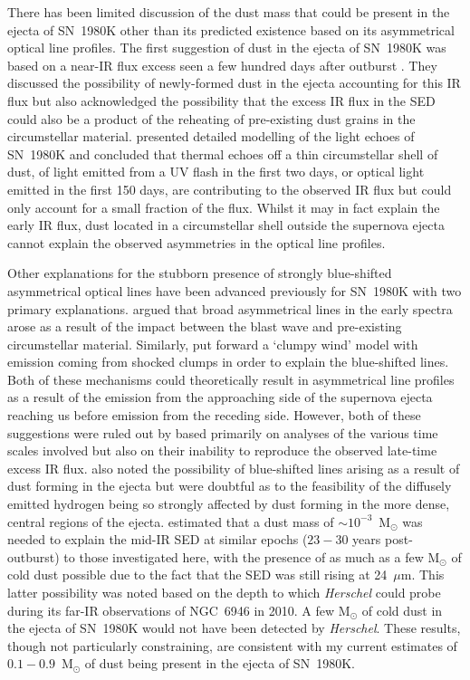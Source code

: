 There has been limited discussion of the dust mass that could be present in the ejecta of SN~1980K other than its predicted existence based on its asymmetrical optical line profiles.  The first suggestion of dust in the ejecta of SN~1980K was based on a near-IR flux excess seen a few hundred days after outburst \citep{Dwek1983}.  They discussed the possibility of newly-formed dust in the ejecta accounting for this IR flux but also acknowledged the possibility that the excess IR flux in the SED could also be a product of the reheating of pre-existing dust grains in the circumstellar material.   \citet{Sugerman2012} presented detailed modelling of the light echoes of SN~1980K and concluded that thermal echoes off a thin circumstellar shell of dust, of light emitted from a UV flash in the first two days, or optical light emitted in the first 150 days, are contributing to the observed IR flux but could  only account for a small fraction of the flux.  Whilst it may in fact explain the early IR flux,  dust located in a circumstellar shell outside the supernova ejecta cannot explain the observed asymmetries in the optical line profiles.



Other explanations for the stubborn presence of strongly blue-shifted asymmetrical optical lines have been advanced previously for SN~1980K  with two primary explanations.  \citet{Fesen1990} argued that broad asymmetrical lines in the early spectra arose as a result of the impact between the blast wave and pre-existing circumstellar material.  Similarly, \citet{Chugai1994} put forward a `clumpy wind' model with emission coming from shocked clumps in order to  explain the blue-shifted lines.  Both of these mechanisms could theoretically result in asymmetrical line profiles as a result of the emission from the approaching side of the supernova ejecta reaching us before emission from the receding side.  However, both of these suggestions were ruled out by \citet{Sugerman2012} based primarily on analyses of the various time scales involved but also on their inability to reproduce the observed late-time excess IR flux.  \citet{Fesen1990}  also noted the possibility of blue-shifted lines  arising as a result of dust forming in the ejecta but were doubtful as to the feasibility of the diffusely emitted hydrogen being so strongly affected by dust forming in the more dense, central regions of the ejecta.  \citet{Sugerman2012} estimated that a dust mass of $\sim10^{-3}$~M$_{\odot}$ was needed to explain the mid-IR SED at similar epochs ($23-30$ years post-outburst) to those investigated here,  with the presence of as much as a few M$_{\odot}$ of cold dust possible due to the fact that the SED was still rising at 24~$\mu$m.  This latter possibility was noted based on the depth to which {\em Herschel} could probe during its far-IR observations of NGC~6946 in 2010. A few M$_{\odot}$ of cold dust  in the ejecta of SN~1980K would not have been detected by {\em Herschel}.  These results, though not particularly constraining, are consistent with my current estimates of $0.1-0.9$~M$_{\odot}$ of dust being present in the ejecta of SN~1980K.




